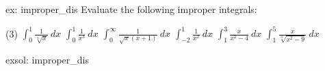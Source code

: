\begin{ex}[]{ex: improper_dis}
    Evaluate the following improper integrals:
    \begin{tasks}(3)
        \task $\int_0^1 \frac{1}{\sqrt[3]{x}}~dx$
        \task $\int_0^1 \frac{1}{x^3}~dx$
        \task $\int_{0}^{\infty} \frac{1}{\sqrt{x}(x+1)}~dx$
        \task $\int_{-2}^1 \frac{1}{x^2}~dx$
        \task $\int_1^3 \frac{x}{x^2-4}~dx$
        \task $\int_1^5 \frac{x}{\sqrt[3]{x^2-9}}~dx$
    \end{tasks}
\end{ex}

\begin{exsol}[]{exsol: improper_dis}
    \lipsum[2-4]
    \lipsum[2-4]
    \lipsum[2-4]
\end{exsol}